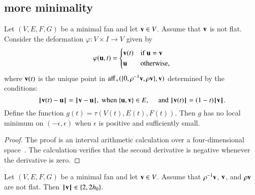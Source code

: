 \subsection{more minimality}





\begin{lemma} 
Let $(V,E,F,G)$ be a minimal fan and let $\v\in V$.  Assume that $\v$ is not flat.
Consider the deformation $\varphi:V\times I\to V$ given by
$$
\varphi(\u,t) =
\begin{cases}
\v(t) & \text{if } \u=\v\\
\u & \text{otherwise},\\
\end{cases}
$$
where $\v(t)$ is the unique point in $\op{aff}_+(\{0,\rho^{-1}\v,\rho \v\},\v)$ determined by the conditions:
$$
\norm{\v(t)}{\u} = \norm{\v}{\u}, \text{~when~} \{\u,\v\}\in E,\quad
\text{~and~}
\normo{\v(t)} = (1-t)\normo{\v}.
$$
Define the function
$g(t)=\tau(V(t),E(t),F(t))$.
Then 
 $g$ has no local minimum on $(-\epsilon,\epsilon)$ when $\epsilon$ is positive and sufficiently small.
%
%
\end{lemma}


\begin{proof}
The proof is an interval arithmetic calculation over a four-dimensional space~\cite[cc:d2a]{hales:2009:nonlinear}.  %
The calculation verifies  that the second derivative is negative whenever the derivative is zero.
\end{proof}


\begin{corollary}\guid{}
Let $(V,E,F,G)$ be a minimal fan and let $\v\in V$.  Assume that $\rho^{-1}\v$, $\v$, and $\rho \v$ are not flat.
Then $\normo{\v}\in \{2,2\hm\}$.
\end{corollary}



